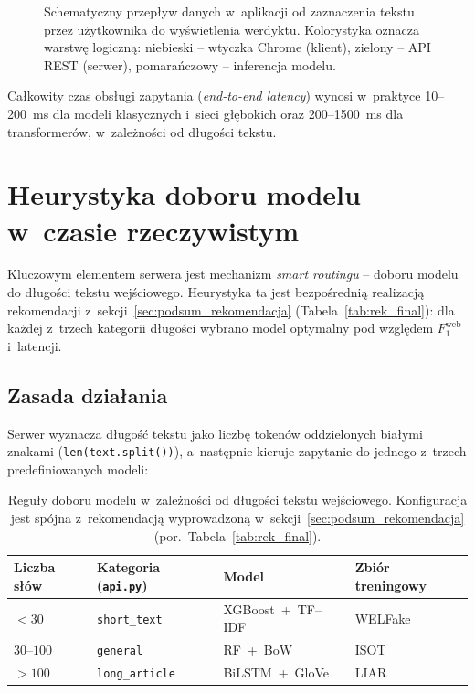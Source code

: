 \documentclass[oneside,polski,logo]{amuthesis}
\begin{document}
\begin{figure}[ht]
\begin{tikzpicture}
\end{tikzpicture}
\caption{Schematyczny przepływ danych w~aplikacji od zaznaczenia
tekstu przez użytkownika do wyświetlenia werdyktu. Kolorystyka
oznacza warstwę logiczną: niebieski -- wtyczka Chrome (klient),
zielony -- API REST (serwer), pomarańczowy -- inferencja modelu.}
\label{fig:przeplyw_danych}
\end{figure}

Całkowity czas obsługi zapytania (\textit{end-to-end latency}) wynosi
w~praktyce 10--200~ms dla modeli klasycznych i~sieci głębokich
oraz 200--1500~ms dla transformerów, w~zależności od długości tekstu.

\section{Heurystyka doboru modelu w~czasie rzeczywistym}
\label{sec:impl_router}

Kluczowym elementem serwera jest mechanizm \textit{smart routingu}
-- doboru modelu do długości tekstu wejściowego. Heurystyka ta jest
bezpośrednią realizacją rekomendacji z~sekcji~\ref{sec:podsum_rekomendacja}
(Tabela~\ref{tab:rek_final}): dla każdej z~trzech kategorii długości
wybrano model optymalny pod względem $F_1^{\text{web}}$ i~latencji.

\subsection*{Zasada działania}

Serwer wyznacza długość tekstu jako liczbę tokenów oddzielonych
białymi znakami (\texttt{len(text.split())}), a~następnie kieruje
zapytanie do jednego z~trzech predefiniowanych modeli:

\begin{table}[ht]
\centering
\caption{Reguły doboru modelu w~zależności od długości tekstu
wejściowego. Konfiguracja jest spójna z~rekomendacją wyprowadzoną
w~sekcji~\ref{sec:podsum_rekomendacja} (por.\
Tabela~\ref{tab:rek_final}).}
\label{tab:routing}
\small
\setlength{\tabcolsep}{6pt}
\begin{tabular}{@{}llll@{}}
\toprule
Liczba słów & Kategoria (\texttt{api.py}) & Model & Zbiór treningowy \\
\midrule
$<30$        & \texttt{short\_text}   & XGBoost~+~TF--IDF & WELFake \\
$30$--$100$  & \texttt{general}       & RF~+~BoW          & ISOT    \\
$>100$       & \texttt{long\_article} & BiLSTM~+~GloVe    & LIAR    \\
\bottomrule
\end{tabular}
\end{table}
\end{document}
